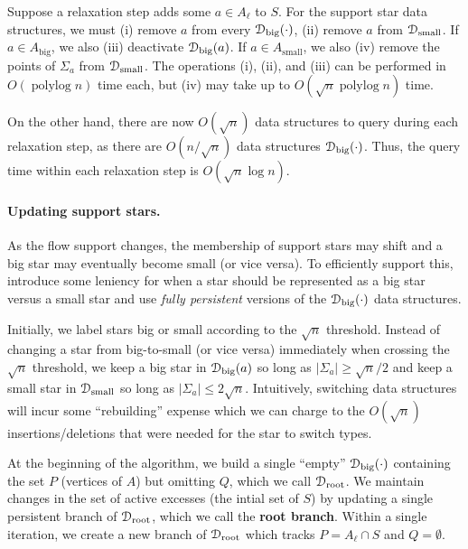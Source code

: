 \documentclass[11pt]{article}
\def\polylog{\mathop{\mathrm{polylog}}}
\def\abs#1{\mathopen| #1 \mathclose|}		%
\theoremstyle{plain}
\numberwithin{figure}{section}
\def\EMPH#1{\textbf{\boldmath #1}}
\begin{document}
Suppose a relaxation step adds some $a \in A_\ell$ to $S$.
For the support star data structures, we must
(i) remove $a$ from every $\EuScript{D}_\text{big}(\cdot)$,
(ii) remove $a$ from $\EuScript{D}_\text{small}$.
If $a \in A_\text{big}$, we also (iii) deactivate $\EuScript{D}_\text{big}(a)$.
If $a \in  A_\text{small}$, we also (iv) remove the points of $\Sigma_a$ from
$\EuScript{D}_\text{small}$.
The operations (i), (ii), and (iii) can be performed in $O(\polylog n)$ time
each, but (iv) may take up to $O(\sqrt{n}\polylog n)$ time.

On the other hand, there are now $O(\sqrt{n})$ data structures to query during
each relaxation step, as there are $O(n/\sqrt{n})$ data structures
$\EuScript{D}_\text{big}(\cdot)$.
Thus, the query time within each relaxation step is $O(\sqrt{n}\log n)$.

\paragraph{Updating support stars.}
As the flow support changes, the membership of support stars may shift and
a big star may eventually become small (or vice versa).
To efficiently support this, introduce some leniency for when a star should be
represented as a big star versus a small star and use \emph{fully persistent}
versions of the $\EuScript{D}_\text{big}(\cdot)$ data structures.

Initially, we label stars big or small according to the $\sqrt{n}$ threshold.
Instead of changing a star from big-to-small (or vice versa) immediately
when crossing the $\sqrt{n}$ threshold, we keep a big star in
$\EuScript{D}_\text{big}(a)$ so long as $\abs{\Sigma_a} \geq \sqrt{n}/2$ and keep
a small star in $\EuScript{D}_\text{small}$ so long as
$\abs{\Sigma_a} \leq 2\sqrt{n}$.
Intuitively, switching data structures will incur some ``rebuilding'' expense
which we can charge to the $O(\sqrt{n})$ insertions/deletions that were needed
for the star to switch types.

At the beginning of the algorithm, we build a single ``empty''
$\EuScript{D}_\text{big}(\cdot)$ containing the set $P$ (vertices of $A$) but
omitting $Q$, which we call $\EuScript{D}_\text{root}$.
We maintain changes in the set of active excesses (the intial set of $S$)
by updating a single persistent branch of $\EuScript{D}_\text{root}$,
which we call the \EMPH{root branch}.
Within a single iteration, we create a new branch of $\EuScript{D}_\text{root}$
which tracks $P = A_\ell \cap S$ and $Q = \emptyset$.
\end{document}
